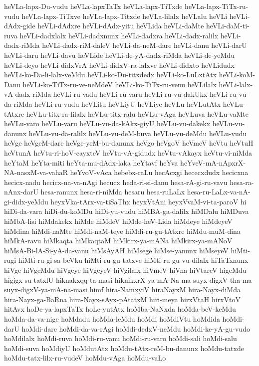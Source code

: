 {heVLa-lapx-Du-vudu
heVLa-lapxTaTx
heVLa-lapx-TiTxde
heVLa-lapx-TiTx-ru-vudu
heVLa-lapx-TiTxve
heVLa-lapx-Titxde
heVLa-lilalx
heVLalu
heVLi
heVLi-dAdx-gide
heVLi-dAdxre
heVLi-dAdx-yitu
heVLida
heVLi-daMte
heVLi-daM-ti-ruva
heVLi-dadxlalx
heVLi-dadxnunx
heVLi-dadxra
heVLi-dadx-ralilx
heVLi-dadx-riMda
heVLi-dadx-riM-daleV
heVLi-da-neM-dare
heVLi-danu
heVLi-darU
heVLi-daru
heVLi-davu
heVLide
heVLi-de-yA-dadx-riMda
heVLi-de-yeMdu
heVLi-deyo
heVLi-didxVrA
heVLi-didxV-ra-lalxve
heVLi-didxto
heVLidudx
heVLi-ko-Da-li-lalx-veMdu
heVLi-ko-Du-titxdedx
heVLi-ko-LuLxtAtx
heVLi-koM-Danu
heVLi-ko-TiTx-ru-ve-neMdeV
heVLi-ko-TiTx-ru-venu
heVLilalx
heVLi-lalx-vA-dadx-riMda
heVLi-ru-vadu
heVLi-ru-varu
heVLi-ru-vu-dakUkx
heVLi-ru-vu-da-riMda
heVLi-ru-vudu
heVLitu
heVLiyU
heVLiye
heVLu
heVLutAtx
heVLu-tAtxre
heVLu-titx-ra-lilalx
heVLu-titx-ralu
heVLu-vAga
heVLuva
heVLu-vaMte
heVLu-varo
heVLu-varu
heVLu-vu-da-kAkx-giyU
heVLu-vu-dakekx
heVLu-vu-danunx
heVLu-vu-da-ralilx
heVLu-vu-deM-buva
heVLu-vu-deMdu
heVLu-vudu
heVge
heVgeM-dare
heVge-yeM-bu-danunx
heVgo
heVgoV
heVmeV
heVtu
heVtuH
heVtunA
heVtu-ri-hoV-cayxteV
heVtu-vA-gidudx
heVtu-vAkayx
heVtu-vi-niMda
heYtaM
heYta-miti
heYta-mu-dAdx-laka
heYtavf
heYva
heYveV-mA-nApxrX-NA-nasxM-va-vahaR
heYvoV-vAca
hebebx-raLu
hecAcxgi
hececxdudx
hecicxna
hecicx-nadu
hecicx-na-va-nAgi
hecucx
heda-ri-si-danu
hesa-rA-gi-ru-vavu
hesa-ra-nAnx-darU
hesa-ranunx
hesa-ri-niMda
hesaru
hesa-ruLaLx
hesa-ru-LaLx-va-nA-gi-didx-yeMdu
heyxVka-tArx-va-tiSaThx
heyxVtAni
heyxVvaM-vi-ta-paroV
hi
hiDi-da-vara
hiDi-du-koMDu
hiDi-yu-vudu
hiMBA-ga-dalilx
hiMDalu
hiMDuva
hiMbA-lisi
hiMdakekx
hiMde
hiMdeV
hiMde-heV-Lida
hiMdeye
hiMdeyeV
hiMdina
hiMdi-naMte
hiMdi-naM-teye
hiMdi-ru-gu-tAtxre
hiMdu-muM-dina
hiMkA-ravu
hiMkaqta
hiMkaqtaM
hiMkirx-ya-mANa
hiMkirx-ya-mANoV
hiMsA-Bi-lA-Si-yA-da-vanu
hiMsAyAH
hiMsege
hiMse-yanunx
hiMseyeV
hiMti-rugi
hiMti-ru-gi-sa-beVku
hiMti-ru-gu-tatxve
hiMti-ru-gu-vu-dilalx
hiTaTxnunx
hiVge
hiVgeMdu
hiVgeye
hiVgeyeV
hiVgilalx
hiVmeV
hiVna
hiVtareV
higeMdu
higigx-su-tatxlU
hiknakxqq-ta-masi
hiknikxrX-ya-mA-Na-ma-suyx-digxV-tha-ma-suyx-digxV-ya-mA-na-masi
himf
hira-NamxyiV
hiraNayxM
hira-Nayx-diMda
hira-Nayx-ga-BaRna
hira-Nayx-sAyx-pAtatxM
hiri-meya
hirxVtaH
hirxVtoV
hitAvx
hoDe-ya-lapxTaTx
hoLe-yutAtx
hoMba-NaNxda
hoMda-beV-keMdu
hoMda-da-va-nige
hoMdadu
hoMda-leMdu
hoMdi
hoMdiVtu
hoMdida
hoMdi-darU
hoMdi-dare
hoMdi-da-va-rAgi
hoMdi-dedxV-neMdu
hoMdi-ke-yA-gu-vudo
hoMdilalx
hoMdi-ruva
hoMdi-ru-vanu
hoMdi-ru-varo
hoMdi-sali
hoMdi-salu
hoMdi-suva
hoMdiyU
hoMdutAtx
hoMdu-tAtx-reM-bu-danunx
hoMdu-tatxde
hoMdu-tatx-lilx-ru-vudeV
hoMdu-vAga
hoMdu-vaLo
}

